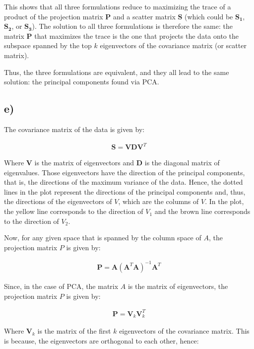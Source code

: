 \documentclass[12pt,a4paper,oneside]{paper}
\begin{document}
This shows that all three formulations reduce to maximizing the trace of a product of the projection matrix \( \bm{P} \) and a scatter matrix \( \bm{S} \) (which could be \( \bm{S_1} \), \( \bm{S_2} \), or \( \bm{S_3} \)). The solution to all three formulations is therefore the same: the matrix \( \bm{P} \) that maximizes the trace is the one that projects the data onto the subspace spanned by the top \( k \) eigenvectors of the covariance matrix (or scatter matrix). 

Thus, the three formulations are equivalent, and they all lead to the same solution: the principal components found via PCA.

\newpage
\subsection*{e)}

The covariance matrix of the data is given by:

\begin{align*}
    \bm{S} = \bm{V} \bm{D} \bm{V}^T
\end{align*}

Where \( \bm{V} \) is the matrix of eigenvectors and \( \bm{D} \) is the diagonal matrix of eigenvalues.
Those eigenvectors have the direction of the principal components, that is, the directions of the maximum variance of the data.
Hence, the dotted lines in the plot represent the directions of the principal components and, thus,
the directions of the eigenvectors of $V$, which are the columns of $V$. In the plot, the
yellow line corresponds to the direction of $V_1$ and the brown line corresponds to the direction of $V_2$.

Now, for any given space that is spanned by the column space of $A$, the projection matrix $P$ is given by:

\begin{align*}
    \bm{P} = \bm{A} (\bm{A}^T \bm{A})^{-1} \bm{A}^T
\end{align*}

Since, in the case of PCA, the matrix $A$ is the matrix of eigenvectors, the projection matrix $P$ is given by:

\begin{align*}
    \bm{P} = \bm{V}_k \bm{V}_k^T
\end{align*}

Where \( \bm{V}_k \) is the matrix of the first \( k \) eigenvectors of the covariance matrix.
This is because, the eigenvectors are orthogonal to each other, hence:
\end{document}
